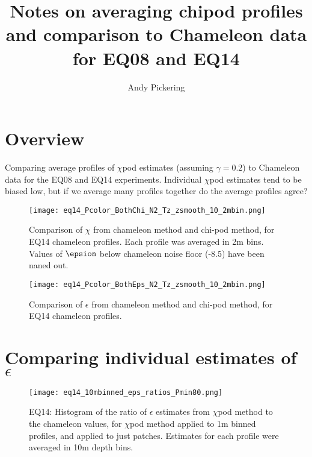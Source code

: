 \documentclass[11pt]{article}
\title{Notes on averaging chipod profiles and comparison to Chameleon data for EQ08 and EQ14}
\author{Andy Pickering}
\begin{document}
\maketitle

\tableofcontents
\newpage

\section{Overview}

Comparing average profiles of $\chi$pod estimates (assuming $\gamma=0.2$) to Chameleon data for the EQ08 and EQ14 experiments. Individual $\chi$pod estimates tend to be biased low, but if we average many profiles together do the average profiles agree?


\begin{figure}[htbp]
\texttt{[image: eq14\_Pcolor\_BothChi\_N2\_Tz\_zsmooth\_10\_2mbin.png]}
\caption{Comparison of $\chi$ from chameleon method and chi-pod method, for EQ14 chameleon profiles. Each profile was averaged in 2m bins.  Values of $\epsion$ below chameleon noise floor (-8.5) have been naned out.}
\label{}
\end{figure}

\begin{figure}[htbp]
\texttt{[image: eq14\_Pcolor\_BothEps\_N2\_Tz\_zsmooth\_10\_2mbin.png]}
\caption{Comparison of $\epsilon$ from chameleon method and chi-pod method, for EQ14 chameleon profiles.}
\label{}
\end{figure}



\clearpage
\section{Comparing individual estimates of $\epsilon$}




\begin{figure}[htbp]
\texttt{[image: eq14\_10mbinned\_eps\_ratios\_Pmin80.png]}
\caption{EQ14: Histogram of the ratio of $\epsilon$ estimates from $\chi$pod method to the chameleon values, for $\chi$pod method applied to 1m binned profiles, and applied to just patches. Estimates for each profile were averaged in 10m depth bins.}
\label{epsrathist_eq14}
\end{figure}
\end{document}
